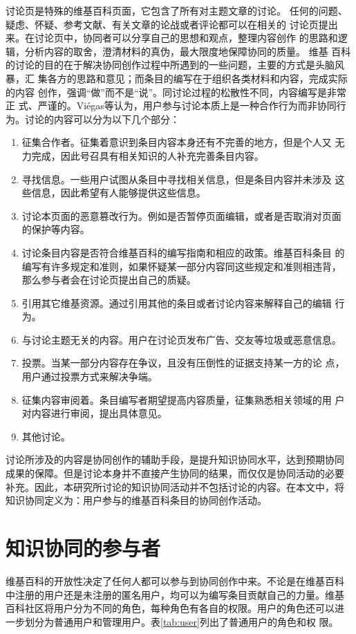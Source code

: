 讨论页是特殊的维基百科页面，它包含了所有对主题文章的讨论。
任何的问题、疑虑、怀疑、参考文献、有关文章的论战或者评论都可以在相关的
讨论页提出来。在讨论页中，协同者可以分享自己的思想和观点，整理内容创作
的思路和逻辑，分析内容的取舍，澄清材料的真伪，最大限度地保障协同的质量。
维基
百科的讨论的目的在于解决协同创作过程中所遇到的一些问题，主要的方式是头脑风暴，汇
集各方的思路和意见；而条目的编写在于组织各类材料和内容，完成实际的内容
创作，强调“做”而不是“说”。同讨论过程的松散性不同，内容编写是非常正
式、严谨的。Viégas等认为，用户参与讨论本质上是一种合作行为而非协同行
为。讨论的内容可以分为以下几个部分：
\begin{enumerate}
\item 征集合作者。征集着意识到条目内容本身还有不完善的地方，但是个人又
  无力完成，因此号召具有相关知识的人补充完善条目内容。
\item 寻找信息。一些用户试图从条目中寻找相关信息，但是条目内容并未涉及
  这些信息，因此希望有人能够提供这些信息。
\item 讨论本页面的恶意篡改行为。例如是否暂停页面编辑，或者是否取消对页面
  的保护等内容。
\item 讨论条目内容是否符合维基百科的编写指南和相应的政策。维基百科条目
  的编写有许多规定和准则，如果怀疑某一部分内容同这些规定和准则相违背，
  那么参与者会在讨论页提出自己的质疑。
\item 引用其它维基资源。通过引用其他的条目或者讨论内容来解释自己的编辑
  行为。
\item 与讨论主题无关的内容。用户在讨论页发布广告、交友等垃圾或恶意信息。
\item 投票。当某一部分内容存在争议，且没有压倒性的证据支持某一方的论
  点，用户通过投票方式来解决争端。
\item 征集内容审阅着。条目编写者期望提高内容质量，征集熟悉相关领域的用
  户对内容进行审阅，提出具体意见。
\item 其他讨论。

\end{enumerate}

讨论所涉及的内容是协同创作的辅助手段，是提升知识协同水平，达到预期协同
成果的保障。但是讨论本身并不直接产生协同的结果，而仅仅是协同活动的必要
补充。因此，本研究所讨论的知识协同活动并不包括讨论的内容。在本文中，将
知识协同定义为：用户参与的维基百科条目的协同创作活动。

\section{知识协同的参与者}
\label{sec:participants}
维基百科的开放性决定了任何人都可以参与到协同创作中来。不论是在维基百科
中注册的用户还是未注册的匿名用户，均可以为编写条目贡献自己的力量。维基
百科社区将用户分为不同的角色，每种角色有各自的权限。用户的角色还可以进
一步划分为普通用户和管理用户。表\ref{tab:user}列出了普通用户的角色和权
限。

